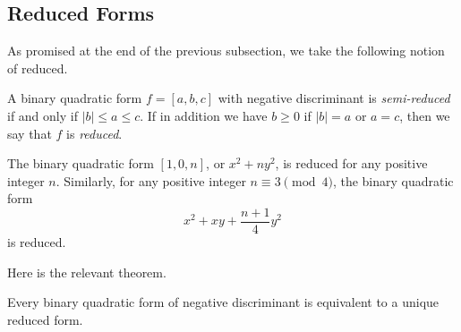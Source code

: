 \documentclass[../notes.tex]{subfiles}
\begin{document}
\subsection{Reduced Forms}
As promised at the end of the previous subsection, we take the following notion of reduced.
\begin{definition}[reduced]
	A binary quadratic form $f=[a,b,c]$ with negative discriminant is \textit{semi-reduced} if and only if $\left|b\right|\le a\le c$. If in addition we have $b\ge0$ if $\left|b\right|=a$ or $a=c$, then we say that $f$ is \textit{reduced}.
\end{definition}
\begin{example}
	The binary quadratic form $[1,0,n]$, or $x^2+ny^2$, is reduced for any positive integer $n$. Similarly, for any positive integer $n\equiv3\pmod4$, the binary quadratic form
	\[x^2+xy+\frac{n+1}4y^2\]
	is reduced.
\end{example}
Here is the relevant theorem.
\begin{theorem} \label{thm:reduce-form}
	Every binary quadratic form of negative discriminant is equivalent to a unique reduced form.
\end{theorem}
\end{document}
